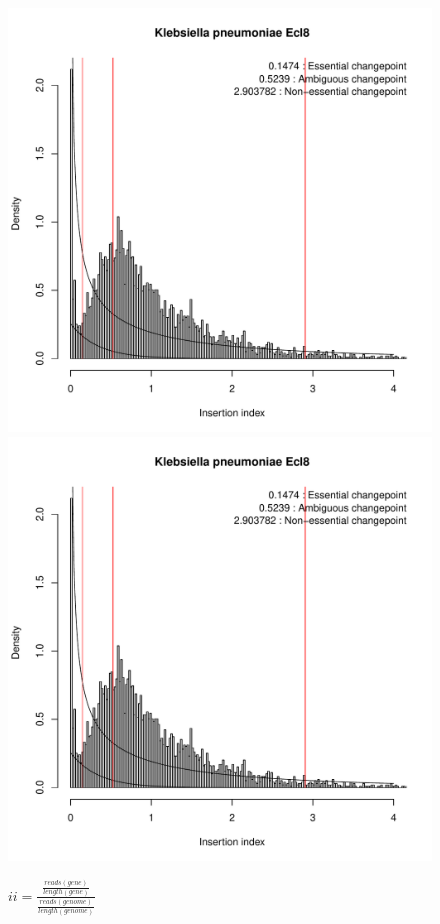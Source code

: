 \documentclass[a4paper,10pt]{article}
\begin{document}
\begin{figure}
\includegraphics[scale=0.2, page=11]{mixtools-reads.pdf}
\includegraphics[scale=0.2, page=12]{mixtools-reads.pdf}
\caption{$ii=\frac{\frac{reads(gene)}{length(gene)}}{\frac{reads(genome)}{length(genome)}}$\newline
}
\end{figure}
\end{document}
